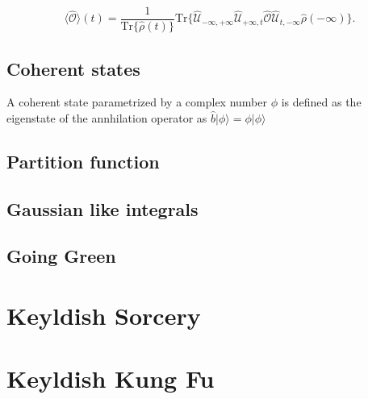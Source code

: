 \documentclass[a4paper, 12pt]{article}
\begin{document}
\begin{equation}
\langle \hat{\mathcal{O}} \rangle (t)  = \frac{1}{\mathrm{Tr}\{\hat{\rho}(t)\}} \mathrm{Tr}\{\hat{\mathcal{U}}_{-\infty,+\infty} \hat{\mathcal{U}}_{+\infty,t} \hat{\mathcal{O}} \hat{\mathcal{U}}_{t,-\infty} \hat{\rho}(-\infty)  \}.
\end{equation}

\subsection {Coherent states}
A coherent state parametrized by a complex number $\phi$ is defined as the eigenstate of the annhilation operator  as $\hat{b} |\phi\rangle = \phi |\phi\rangle$
\subsection {Partition function}

\subsection {Gaussian like integrals}

\subsection {Going Green}


\section {Keyldish Sorcery}

\section {Keyldish Kung Fu}
\end{document}
